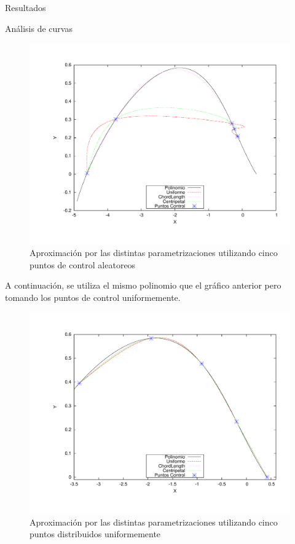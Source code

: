 \begin{section}{Resultados}
\begin{subsection}{Análisis de curvas}
		\begin{figure}[H]
		  \centering
			\includegraphics[width=14cm]{graficos/5p_r.pdf}
		  \caption{Aproximación por las distintas parametrizaciones utilizando cinco puntos de control aleatoreos}
		  \label{fig:5p_r}
		\end{figure}
		
		\VSP
		
		A continuación, se utiliza el mismo polinomio que el gráfico anterior pero tomando los puntos de control uniformemente.
		
		\begin{figure}[H]
		  \centering
			\includegraphics[width=14cm]{graficos/5p_u.pdf}
		  \caption{Aproximación por las distintas parametrizaciones utilizando cinco puntos distribuidos uniformemente}
		  \label{fig:5p_u}
		\end{figure}
		

\end{subsection}
\end{section}
